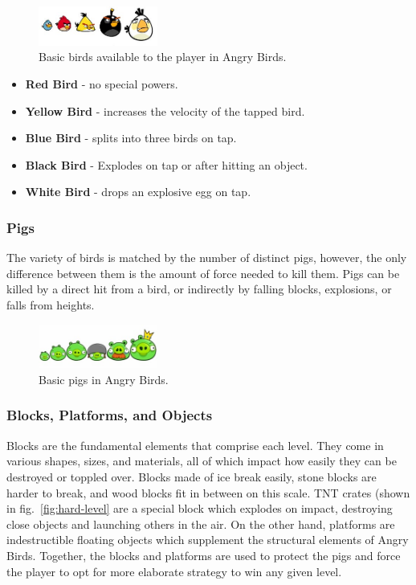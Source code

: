 \begin{figure}
\begin{center}
\includegraphics[trim = 0 10 0 10, clip, width=0.35\textwidth]{images/angry-birds-making-of-birds.jpg}
\end{center}
\caption{Basic birds available to the player in Angry Birds.}
\label{fig:birds}
\end{figure}

\begin{itemize}
\item \textbf{Red Bird} - no special powers.
\item \textbf{Yellow Bird} - increases the velocity of the tapped bird.
\item \textbf{Blue Bird} - splits into three birds on tap.
\item \textbf{Black Bird} - Explodes on tap or after hitting an object.
\item \textbf{White Bird} - drops an explosive egg on tap. 
\end{itemize}


\subsubsection{Pigs}
The variety of birds is matched by the number of distinct pigs, however, the only difference between them is the amount of force needed to kill them. Pigs can be killed by a direct hit from a bird, or indirectly by falling blocks, explosions, or falls from heights. 

\begin{figure}
\begin{center}
\includegraphics[trim = 0 20 0 20, clip, width=0.35\textwidth]{images/pigs.jpeg}
\end{center}
\caption{Basic pigs in Angry Birds.}
\label{fig:pigs}
\end{figure}

\subsubsection{Blocks, Platforms, and Objects}
Blocks are the fundamental elements that comprise each level. They come in various shapes, sizes, and materials, all of which impact how easily they can be destroyed or toppled over. Blocks made of ice break easily, stone blocks are harder to break, and wood blocks fit in between on this scale. TNT crates (shown in fig.~\ref{fig:hard-level} are a special block which explodes on impact, destroying close objects and launching others in the air. 
On the other hand, platforms are indestructible floating objects which supplement the structural elements of Angry Birds. Together, the blocks and platforms are used to protect the pigs and force the player to opt for more elaborate strategy to win any given level. 

